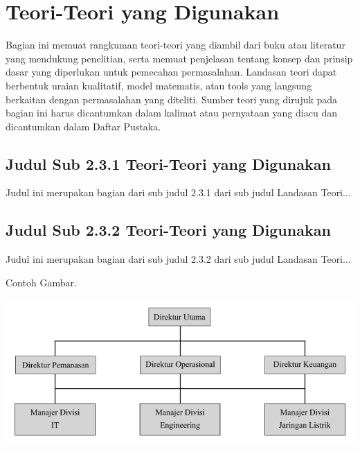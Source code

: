 \documentclass[oneside,listof=totoc]{scrbook}
\begin{document}
\clearpage
\section{Teori-Teori yang Digunakan}
Bagian ini memuat rangkuman teori-teori yang diambil dari buku atau literatur yang mendukung penelitian, serta memuat penjelasan tentang konsep dan prinsip dasar yang diperlukan untuk pemecahan permasalahan. Landasan teori dapat berbentuk uraian kualitatif, model matematis, atau tools yang langsung berkaitan dengan permasalahan yang diteliti. Sumber teori yang dirujuk pada bagian ini harus dicantumkan dalam kalimat atau pernyataan yang diacu dan dicantumkan dalam Daftar Pustaka.

\subsection{Judul Sub 2.3.1 Teori-Teori yang Digunakan}
Judul ini merupakan bagian dari sub judul 2.3.1 dari sub judul Landasan Teori...

\subsection{Judul Sub 2.3.2 Teori-Teori yang Digunakan}
Judul ini merupakan bagian dari sub judul 2.3.2 dari sub judul Landasan Teori...

\noindent Contoh Gambar.

\vspace{0.5cm}

\begin{center}
  \begin{minipage}{\textwidth}
    \label{gambar:2.1}
    \includegraphics[width=14.5cm]{gambar/gambar_2_1.png}
    \vspace{-0.5cm}
  \end{minipage}
\end{center}
\end{document}
